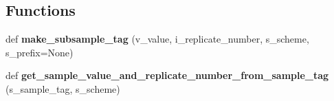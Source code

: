 \subsection*{Functions}
\begin{DoxyCompactItemize}
\item 
def {\bfseries make\+\_\+subsample\+\_\+tag} (v\+\_\+value, i\+\_\+replicate\+\_\+number, s\+\_\+scheme, s\+\_\+prefix=None)\hypertarget{namespacenegui_1_1genepopfilesampler_a64afa11c4c2d928a96377cdf3d610012}{}\label{namespacenegui_1_1genepopfilesampler_a64afa11c4c2d928a96377cdf3d610012}

\item 
def {\bfseries get\+\_\+sample\+\_\+value\+\_\+and\+\_\+replicate\+\_\+number\+\_\+from\+\_\+sample\+\_\+tag} (s\+\_\+sample\+\_\+tag, s\+\_\+scheme)\hypertarget{namespacenegui_1_1genepopfilesampler_add6542ca0344658bb772d671ef34d761}{}\label{namespacenegui_1_1genepopfilesampler_add6542ca0344658bb772d671ef34d761}

\end{DoxyCompactItemize}

